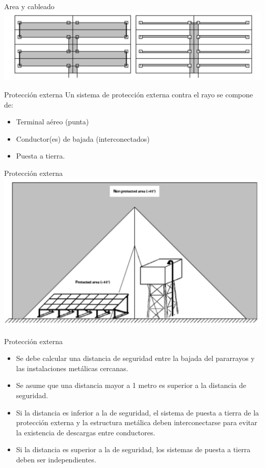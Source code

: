 \documentclass[xcolor={usenames,svgnames,dvipsnames}]{beamer}
\begin{document}
\begin{frame}[label=sec-4-2-2]{Area y cableado}
\includegraphics[width=.9\linewidth]{../figs/BucleCableadoOptimo.pdf}
\end{frame}

\begin{frame}[label=sec-4-2-3]{Protección externa}
Un sistema de protección externa contra el rayo se compone de:

\begin{itemize}
\item Terminal aéreo (punta)

\item Conductor(es) de bajada (interconectados)

\item Puesta a tierra.
\end{itemize}
\end{frame}

\begin{frame}[label=sec-4-2-4]{Protección externa}
\includegraphics[width=.9\linewidth]{../figs/AreaProteccionPararrayos.pdf}
\end{frame}

\begin{frame}[label=sec-4-2-5]{Protección externa}
\begin{itemize}
\item Se debe calcular una \alert{distancia de seguridad} entre la bajada del
pararrayos y las instalaciones metálicas cercanas.

\item Se asume que una distancia mayor a 1 metro es superior a la distancia
de seguridad.

\item \alert{Si la distancia es inferior a la de seguridad}, el sistema de puesta
a tierra de la protección externa y la estructura metálica deben
\alert{interconectarse} para evitar la existencia de descargas entre
conductores.

\item \alert{Si la distancia es superior a la de seguridad}, los sistemas de
puesta a tierra deben ser \alert{independientes}.
\end{itemize}
\end{frame}
\end{document}
